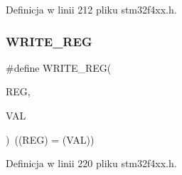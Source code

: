 Definicja w linii 212 pliku stm32f4xx.\+h.

\mbox{\label{group___exported__macro_ga32f78bffcaf6d13023dcd7f05e0c4d57}} 
\subsubsection{\texorpdfstring{W\+R\+I\+T\+E\+\_\+\+R\+EG}{WRITE\_REG}}
{\footnotesize\ttfamily \#define W\+R\+I\+T\+E\+\_\+\+R\+EG(\begin{DoxyParamCaption}\item[{}]{R\+EG,  }\item[{}]{V\+AL }\end{DoxyParamCaption})~((R\+EG) = (V\+AL))}



Definicja w linii 220 pliku stm32f4xx.\+h.


